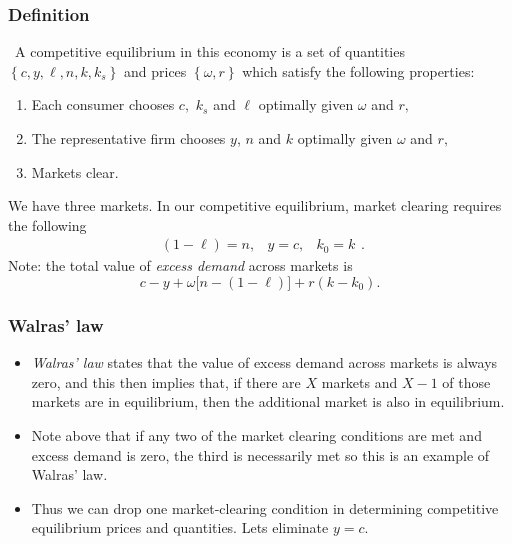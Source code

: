 \documentclass[aspectratio=169]{ltx-talk}
\begin{document}
\begin{frame}
\frametitle{Definition}
\ A competitive equilibrium in this economy is
a set of quantities $\left\{ c,y,\ell ,n,k,k_{s}\right\} $ and prices $%
\left\{ \omega ,r\right\} $ which satisfy the following properties:

\begin{enumerate}
\item Each consumer chooses $c,$ $k_{s}$ and $\ell $ optimally given $\omega 
$ and $r,$

\item The representative firm chooses $y$, $n$ and $k$ optimally given $%
\omega $ and $r,$

\item Markets clear.
\end{enumerate}

We have three markets. In our competitive equilibrium, market clearing
requires the following%
\begin{equation*}
\begin{array}{lll}
(1-\ell )=n, & y=c, & k_{0}=k%
\end{array}%
.
\end{equation*}%
Note: the total value of \textit{excess demand} across markets is%
\begin{equation*}
c-y+\omega \lbrack n-(1-\ell )]+r(k-k_{0}).
\end{equation*}
\end{frame}

\begin{frame}
\frametitle{Walras{'} law}
\begin{itemize}
\item \textit{Walras' law} states that the value of excess demand across
markets is always zero, and this then implies that, if there are $X$ markets
and $X-1$ of those markets are in equilibrium, then the additional market is
also in equilibrium.

\item Note above that if any two of the market clearing conditions are met
and excess demand is zero, the third is necessarily met so this is an
example of Walras' law\textit{.}

\item Thus we can drop one market-clearing condition in determining
competitive equilibrium prices and quantities. Lets eliminate $y=c$.
\end{itemize}
\end{frame}
\end{document}
